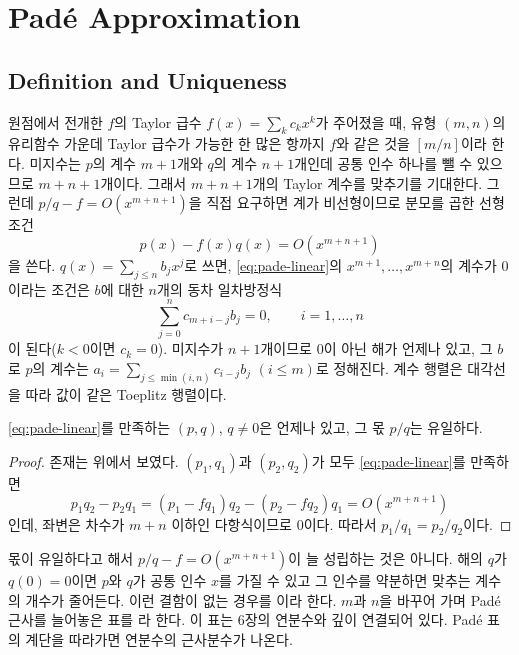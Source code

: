 \section{Padé Approximation}
\label{sec:pade}

\subsection{Definition and Uniqueness}

원점에서 전개한 $f$의 Taylor 급수 $f(x)=\sum_kc_kx^k$가 주어졌을 때, 유형 $(m,n)$의 유리함수 가운데 Taylor 급수가 가능한 한 많은 항까지 $f$와 같은 것을  $[m/n]$이라 한다\cite{pade1892,baker1996pade}. 미지수는 $p$의 계수 $m+1$개와 $q$의 계수 $n+1$개인데 공통 인수 하나를 뺄 수 있으므로 $m+n+1$개이다. 그래서 $m+n+1$개의 Taylor 계수를 맞추기를 기대한다. 그런데 $p/q-f=O(x^{m+n+1})$을 직접 요구하면 계가 비선형이므로 분모를 곱한 선형 조건
\begin{equation}
\label{eq:pade-linear}
p(x)-f(x)q(x)=O(x^{m+n+1})
\end{equation}
을 쓴다. $q(x)=\sum_{j\le n}b_jx^j$로 쓰면, \eqref{eq:pade-linear}의 $x^{m+1},\dots,x^{m+n}$의 계수가 $0$이라는 조건은 $b$에 대한 $n$개의 동차 일차방정식
\[
\sum_{j=0}^nc_{m+i-j}b_j=0,\qquad i=1,\dots,n
\]
이 된다($k<0$이면 $c_k=0$). 미지수가 $n+1$개이므로 $0$이 아닌 해가 언제나 있고, 그 $b$로 $p$의 계수는 $a_i=\sum_{j\le\min(i,n)}c_{i-j}b_j$ $(i\le m)$로 정해진다. 계수 행렬은 대각선을 따라 값이 같은 Toeplitz 행렬이다.

\begin{proposition}
\label{prop:pade-unique}
\eqref{eq:pade-linear}를 만족하는 $(p,q)$, $q\ne0$은 언제나 있고, 그 몫 $p/q$는 유일하다.
\end{proposition}

\begin{proof}
존재는 위에서 보였다. $(p_1,q_1)$과 $(p_2,q_2)$가 모두 \eqref{eq:pade-linear}를 만족하면
\[
p_1q_2-p_2q_1=(p_1-fq_1)q_2-(p_2-fq_2)q_1=O(x^{m+n+1})
\]
인데, 좌변은 차수가 $m+n$ 이하인 다항식이므로 $0$이다. 따라서 $p_1/q_1=p_2/q_2$이다.
\end{proof}

몫이 유일하다고 해서 $p/q-f=O(x^{m+n+1})$이 늘 성립하는 것은 아니다. 해의 $q$가 $q(0)=0$이면 $p$와 $q$가 공통 인수 $x$를 가질 수 있고 그 인수를 약분하면 맞추는 계수의 개수가 줄어든다. 이런 결함이 없는 경우를 이라 한다. $m$과 $n$을 바꾸어 가며 Padé 근사를 늘어놓은 표를 라 한다. 이 표는 6장의 연분수와 깊이 연결되어 있다. Padé 표의 계단을 따라가면 연분수의 근사분수가 나온다\cite{gragg1972pade}.

